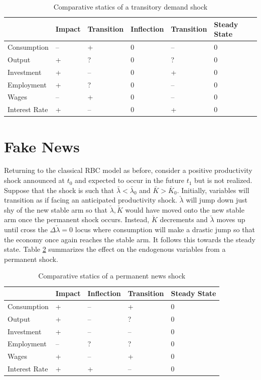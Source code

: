\documentclass[11pt]{article}
\begin{document}
    \begin{table}[h] \centering
    \caption{Comparative statics of a transitory demand shock}
    \label{tab:tempbetashock}
    \begin{tabular}{p{2.2cm}p{2.2cm}p{2.2cm}p{2.2cm}p{2.2cm}p{2.2cm}}
    \hline
     & Impact & Transition & Inflection & Transition & Steady State \tabularnewline
    \hline
    Consumption & -- & + & 0 & -- & 0 \tabularnewline
    Output & + & ? & 0 & ? & 0 \tabularnewline
    Investment & + & -- & 0 & + & 0 \tabularnewline
    Employment & + & ? & 0 & -- & 0 \tabularnewline
    Wages & -- & + & 0 & -- & 0 \tabularnewline
    Interest Rate & + & -- & 0 & + & 0 \tabularnewline
    \hline
    \end{tabular}
    \end{table}

\section{Fake News}

    Returning to the classical RBC model as before, consider a positive productivity shock announced at $t_0$ and expected to occur in the future $t_1$ but is not realized. Suppose that the shock is such that $\bar \lambda < \bar \lambda_0$ and $\bar K > \bar K_0$. Initially, variables will transition as if facing an anticipated productivity shock. $\check \lambda$ will jump down just shy of the new stable arm so that $\check \lambda, \check K$ would have moved onto the new stable arm once the permanent shock occurs. Instead, $\check K$ decrements and $\check \lambda$ moves up until cross the $\Delta \check \lambda = 0$ locus where consumption will make a drastic jump so that the economy once again reaches the stable arm. It follows this towards the steady state. Table \ref{tab:permnewsshock} summarizes the effect on the endogenous variables from a permanent shock.


    \begin{table}[h] \centering
    \caption{Comparative statics of a permanent news shock}
    \label{tab:permnewsshock}
    \begin{tabular}{p{2.5cm}p{2.5cm}p{2.5cm}p{2.5cm}p{2.5cm}}
    \hline
     & Impact & Inflection & Transition & Steady State \tabularnewline
    \hline
    Consumption & + & -- & + & 0 \tabularnewline
    Output & + & -- & ? & 0 \tabularnewline
    Investment & + & -- & -- & 0 \tabularnewline
    Employment & -- & ? & ? & 0 \tabularnewline
    Wages & + & -- & + & 0 \tabularnewline
    Interest Rate & + & + & -- & 0 \tabularnewline
    \hline
    \end{tabular}
    \end{table}
\end{document}
